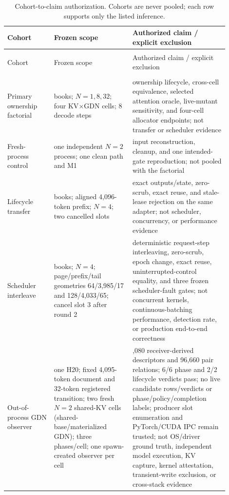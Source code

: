\documentclass{article}
\begin{document}
\begingroup
\footnotesize
\setlength{\LTpre}{0pt}
\setlength{\LTpost}{0pt}
\begin{longtable}{@{}>{\raggedright\arraybackslash}p{0.19\linewidth}>{\raggedright\arraybackslash}p{0.32\linewidth}>{\raggedright\arraybackslash}p{0.39\linewidth}@{}}
  \caption{Cohort-to-claim authorization.  Cohorts are never pooled; each row
  supports only the listed inference.}
  \label{tab:cohorts}\\
  \toprule
  Cohort & Frozen scope & Authorized claim / explicit exclusion \\
  \midrule
  \endfirsthead
  \multicolumn{3}{c}{\textit{Table~\ref{tab:cohorts} continued.}}\\
  \toprule
  Cohort & Frozen scope & Authorized claim / explicit exclusion \\
  \midrule
  \endhead
  \midrule
  \multicolumn{3}{r}{\textit{Continued on next page}}\\
  \endfoot
  \bottomrule
  \endlastfoot
  Primary ownership factorial & 8 books; $N=1,8,32$; four KV$\times$GDN cells; 8 decode steps & ownership lifecycle, cross-cell equivalence, selected attention oracle, live-mutant sensitivity, and four-cell allocator endpoints; not transfer or scheduler evidence \\
  Fresh-process control & one independent $N=2$ process; one clean path and M1 & input reconstruction, cleanup, and one intended-gate reproduction; not pooled with the factorial \\
  Lifecycle transfer & 8 books; aligned 4,096-token prefix; $N=4$; two cancelled slots & exact outputs/state, zero-scrub, exact reuse, and stale-lease rejection on the same adapter; not scheduler, concurrency, or performance evidence \\
  Scheduler interleave & 8 books; $N=4$; page/prefix/tail geometries 64/3,985/17 and 128/4,033/65; cancel slot 3 after round 2 & deterministic request-step interleaving, zero-scrub, epoch change, exact reuse, uninterrupted-control equality, and three frozen scheduler-fault gates; not concurrent kernels, continuous-batching performance, detection rate, or production end-to-end correctness \\
  Out-of-process GDN observer & one H20; fixed 4,095-token document and 32-token registered transition; two fresh $N=2$ shared-KV cells (shared-base/materialized GDN); three phases/cell; one spawn-created observer per cell & 1,080 receiver-derived descriptors and 96,660 pair relations; 6/6 phase and 2/2 lifecycle verdicts pass; no live candidate rows/verdicts or phase/policy/completion labels; producer slot enumeration and PyTorch/CUDA IPC remain trusted; not OS/driver ground truth, independent model execution, KV capture, kernel attestation, transient-write exclusion, or cross-stack evidence \\

\end{longtable}
\end{document}

